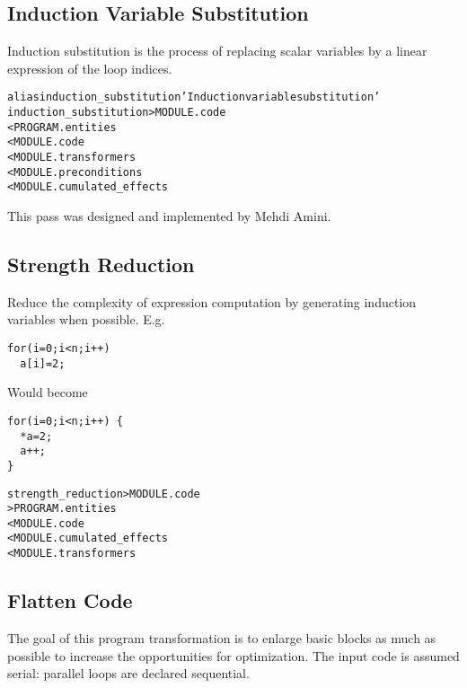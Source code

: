 \documentclass[a4paper]{report}
\newenvironment{PipsMake}{\begin{alltt}}{\end{alltt}}
\newenvironment{PipsPass}[1]{\label{pass:#1}}{}
\begin{document}
\subsection{Induction Variable Substitution}

\begin{PipsPass}{induction_substitution}
Induction substitution is the process of replacing scalar variables
by a linear expression of the loop indices.
\end{PipsPass}


\begin{PipsMake}
alias induction_substitution 'Induction variable substitution'
induction_substitution > MODULE.code
        < PROGRAM.entities
        < MODULE.code
        < MODULE.transformers
        < MODULE.preconditions
        < MODULE.cumulated_effects
\end{PipsMake}

This pass was designed and implemented by Mehdi Amini.

\subsection{Strength Reduction}

\begin{PipsPass}{strength_reduction}
Reduce the complexity of expression computation by generating
induction variables when possible.
\end{PipsPass}
E.g.
\begin{lstlisting}
for(i=0;i<n;i++)
  a[i]=2;
\end{lstlisting}
Would become
\begin{lstlisting}
for(i=0;i<n;i++) {
  *a=2;
  a++;
}
\end{lstlisting}
\begin{PipsMake}
strength_reduction > MODULE.code
                   > PROGRAM.entities
    < MODULE.code
    < MODULE.cumulated_effects
    < MODULE.transformers
\end{PipsMake}


\subsection{Flatten Code}

\begin{PipsPass}{flatten_code}
The goal of this program transformation is to enlarge basic blocks as
much as possible to increase the opportunities for optimization. The
input code is assumed serial: parallel loops are declared sequential.
\end{PipsPass}
\end{document}
